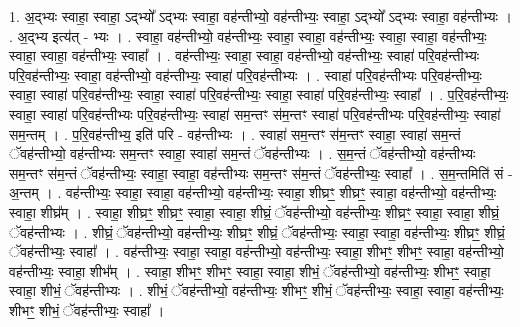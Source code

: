 \documentclass[17pt]{extarticle}
\begin{document}
1. अ॒द्भ्यः स्वाहा॒ स्वाहा॒ ऽद्भ्यो᳚ ऽद्भ्यः स्वाहा॒ वह॑न्तीभ्यो॒ वह॑न्तीभ्यः॒ स्वाहा॒ ऽद्भ्यो᳚ ऽद्भ्यः स्वाहा॒ वह॑न्तीभ्यः । . अ॒द्भ्य इत्य॑त् - भ्यः । . स्वाहा॒ वह॑न्तीभ्यो॒ वह॑न्तीभ्यः॒ स्वाहा॒ स्वाहा॒ वह॑न्तीभ्यः॒ स्वाहा॒ स्वाहा॒ वह॑न्तीभ्यः॒ स्वाहा॒ स्वाहा॒ वह॑न्तीभ्यः॒ स्वाहा᳚ । . वह॑न्तीभ्यः॒ स्वाहा॒ स्वाहा॒ वह॑न्तीभ्यो॒ वह॑न्तीभ्यः॒ स्वाहा॑ परि॒वह॑न्तीभ्यः परि॒वह॑न्तीभ्यः॒ स्वाहा॒ वह॑न्तीभ्यो॒ वह॑न्तीभ्यः॒ स्वाहा॑ परि॒वह॑न्तीभ्यः । . स्वाहा॑ परि॒वह॑न्तीभ्यः परि॒वह॑न्तीभ्यः॒ स्वाहा॒ स्वाहा॑ परि॒वह॑न्तीभ्यः॒ स्वाहा॒ स्वाहा॑ परि॒वह॑न्तीभ्यः॒ स्वाहा॒ स्वाहा॑ परि॒वह॑न्तीभ्यः॒ स्वाहा᳚ । . प॒रि॒वह॑न्तीभ्यः॒ स्वाहा॒ स्वाहा॑ परि॒वह॑न्तीभ्यः परि॒वह॑न्तीभ्यः॒ स्वाहा॑ सम॒न्तꣳ स॑म॒न्तꣳ स्वाहा॑ परि॒वह॑न्तीभ्यः परि॒वह॑न्तीभ्यः॒ स्वाहा॑ सम॒न्तम् । . प॒रि॒वह॑न्तीभ्य॒ इति॑ परि - वह॑न्तीभ्यः । . स्वाहा॑ सम॒न्तꣳ स॑म॒न्तꣳ स्वाहा॒ स्वाहा॑ सम॒न्तं ॅवह॑न्तीभ्यो॒ वह॑न्तीभ्यः सम॒न्तꣳ स्वाहा॒ स्वाहा॑ सम॒न्तं ॅवह॑न्तीभ्यः । . स॒म॒न्तं ॅवह॑न्तीभ्यो॒ वह॑न्तीभ्यः सम॒न्तꣳ स॑म॒न्तं ॅवह॑न्तीभ्यः॒ स्वाहा॒ स्वाहा॒ वह॑न्तीभ्यः सम॒न्तꣳ स॑म॒न्तं ॅवह॑न्तीभ्यः॒ स्वाहा᳚ । . स॒म॒न्तमिति॑ सं - अ॒न्तम् । . वह॑न्तीभ्यः॒ स्वाहा॒ स्वाहा॒ वह॑न्तीभ्यो॒ वह॑न्तीभ्यः॒ स्वाहा॒ शीघ्रꣳ॒॒ शीघ्रꣳ॒॒ स्वाहा॒ वह॑न्तीभ्यो॒ वह॑न्तीभ्यः॒ स्वाहा॒ शीघ्र᳚म् । . स्वाहा॒ शीघ्रꣳ॒॒ शीघ्रꣳ॒॒ स्वाहा॒ स्वाहा॒ शीघ्रं॒ ॅवह॑न्तीभ्यो॒ वह॑न्तीभ्यः॒ शीघ्रꣳ॒॒ स्वाहा॒ स्वाहा॒ शीघ्रं॒ ॅवह॑न्तीभ्यः । . शीघ्रं॒ ॅवह॑न्तीभ्यो॒ वह॑न्तीभ्यः॒ शीघ्रꣳ॒॒ शीघ्रं॒ ॅवह॑न्तीभ्यः॒ स्वाहा॒ स्वाहा॒ वह॑न्तीभ्यः॒ शीघ्रꣳ॒॒ शीघ्रं॒ ॅवह॑न्तीभ्यः॒ स्वाहा᳚ । . वह॑न्तीभ्यः॒ स्वाहा॒ स्वाहा॒ वह॑न्तीभ्यो॒ वह॑न्तीभ्यः॒ स्वाहा॒ शीभꣳ॒॒ शीभꣳ॒॒ स्वाहा॒ वह॑न्तीभ्यो॒ वह॑न्तीभ्यः॒ स्वाहा॒ शीभ᳚म् । . स्वाहा॒ शीभꣳ॒॒ शीभꣳ॒॒ स्वाहा॒ स्वाहा॒ शीभं॒ ॅवह॑न्तीभ्यो॒ वह॑न्तीभ्यः॒ शीभꣳ॒॒ स्वाहा॒ स्वाहा॒ शीभं॒ ॅवह॑न्तीभ्यः । . शीभं॒ ॅवह॑न्तीभ्यो॒ वह॑न्तीभ्यः॒ शीभꣳ॒॒ शीभं॒ ॅवह॑न्तीभ्यः॒ स्वाहा॒ स्वाहा॒ वह॑न्तीभ्यः॒ शीभꣳ॒॒ शीभं॒ ॅवह॑न्तीभ्यः॒ स्वाहा᳚ । \newline
\end{document}
